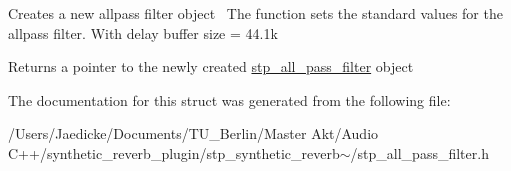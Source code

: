 Creates a new allpass filter object~\newline
 The function sets the standard values for the allpass filter. With delay buffer size = 44.\+1k ~\newline
 

\begin{DoxyReturn}{Returns}
a pointer to the newly created \hyperlink{structstp__all__pass__filter}{stp\+\_\+all\+\_\+pass\+\_\+filter} object ~\newline
 
\end{DoxyReturn}


The documentation for this struct was generated from the following file\+:\begin{DoxyCompactItemize}
\item 
/\+Users/\+Jaedicke/\+Documents/\+T\+U\+\_\+\+Berlin/\+Master Akt/\+Audio C++/synthetic\+\_\+reverb\+\_\+plugin/stp\+\_\+synthetic\+\_\+reverb$\sim$/stp\+\_\+all\+\_\+pass\+\_\+filter.\+h\end{DoxyCompactItemize}
